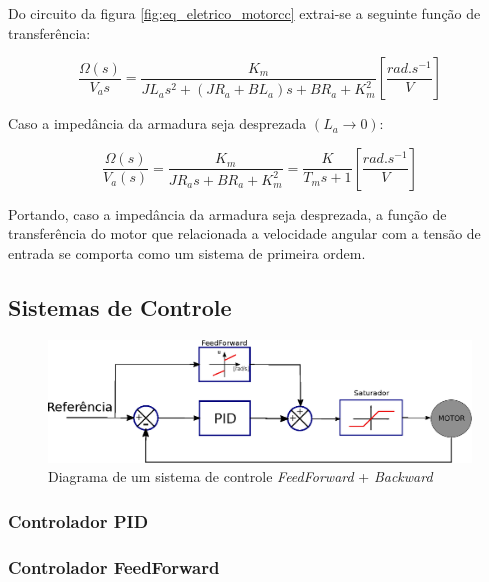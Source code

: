 Do circuito da figura \ref{fig:eq_eletrico_motorcc} extrai-se a seguinte função de transferência:

\begin{equation*}
    \frac{\Omega(s)}{V_a{s}} = \frac{K_m}{JL_{a}s^2 + \left(JR_a + BL_a \right)s + BR_a + K_{m}^2} \left[\frac{ rad.s^{-1}}{V}  \right]
\end{equation*}

Caso a impedância da armadura seja desprezada $(L_a \xrightarrow{} 0)$:

\begin{equation}
    \frac{\Omega(s)}{V_{a}(s)} = \frac{K_m}{JR_{a}s + BR_{a} + K_{m}^2} = \frac{K}{T_{m}s + 1} \left[\frac{ rad.s^{-1}}{V}  \right]
    \label{eq:motor_transf_func}
\end{equation}

Portando, caso a impedância da armadura seja desprezada, a função de transferência do motor que relacionada a velocidade angular com a tensão de entrada se comporta como um sistema de primeira ordem.

\subsection{Sistemas de Controle}

\begin{figure}[H]
    \centering
    \includegraphics[width=\textwidth]{imagens/ilustracoes/sistema_de_controle_completo.eps}
    \caption{Diagrama de um sistema de controle \textit{FeedForward} + \textit{Backward}}
    \label{fig:diagrama_sistema_de_controle_feedforward_backward}
\end{figure}

\subsubsection{Controlador PID}

\subsubsection{Controlador FeedForward}

